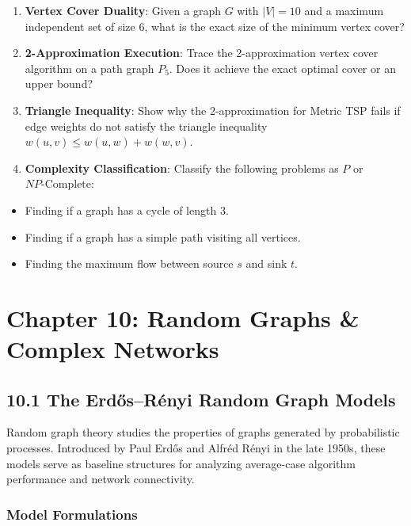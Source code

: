 \documentclass[
]{book}
\providecommand{\tightlist}{%
  \setlength{\itemsep}{0pt}\setlength{\parskip}{0pt}}
\theoremstyle{definition}
\theoremstyle{definition}
\theoremstyle{definition}
\theoremstyle{definition}
\theoremstyle{remark}
\begin{document}
\begin{enumerate}
\def\labelenumi{\arabic{enumi}.}
\tightlist
\item
  \textbf{Vertex Cover Duality}: Given a graph \(G\) with \(\vert{}V\vert{} = 10\) and a maximum independent set of size \(6\), what is the exact size of the minimum vertex cover?
\item
  \textbf{2-Approximation Execution}: Trace the 2-approximation vertex cover algorithm on a path graph \(P_5\). Does it achieve the exact optimal cover or an upper bound?
\item
  \textbf{Triangle Inequality}: Show why the 2-approximation for Metric TSP fails if edge weights do not satisfy the triangle inequality \(w(u, v) \le w(u, w) + w(w, v)\).
\item
  \textbf{Complexity Classification}: Classify the following problems as \(P\) or \(NP\text{-Complete}\):
\end{enumerate}

\begin{itemize}
\tightlist
\item
  Finding if a graph has a cycle of length 3.
\item
  Finding if a graph has a simple path visiting all vertices.
\item
  Finding the maximum flow between source \(s\) and sink \(t\).
\end{itemize}

\chapter{Chapter 10: Random Graphs \& Complex Networks}\label{chapter-10-random-graphs-complex-networks}

\section{10.1 The Erdős--Rényi Random Graph Models}\label{the-erdux151sruxe9nyi-random-graph-models}

Random graph theory studies the properties of graphs generated by probabilistic processes. Introduced by Paul Erdős and Alfréd Rényi in the late 1950s, these models serve as baseline structures for analyzing average-case algorithm performance and network connectivity.

\subsection{Model Formulations}\label{model-formulations}
\end{document}
